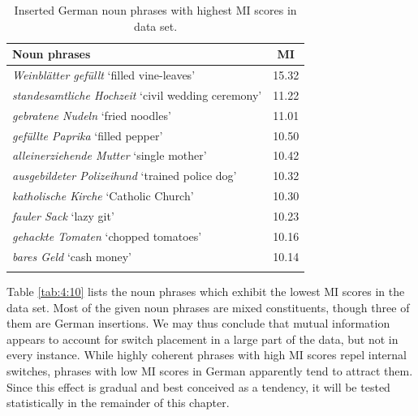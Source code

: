 \begin{table}
		\begin{tabular}{lr}
		\lsptoprule
			Noun phrases	& \multicolumn{1}{c}{MI} \\\midrule
			\textit{Weinblätter gefüllt	} `filled vine-leaves'	&15.32\\
			\textit{standesamtliche Hochzeit} `civil wedding ceremony'	&11.22\\
			\textit{gebratene Nudeln} `fried noodles'	&11.01\\
			\textit{gefüllte Paprika} `filled pepper'	&10.50\\
			\textit{alleinerziehende Mutter} `single mother'	&10.42\\
			\textit{ausgebildeter Polizeihund}	`trained police dog'	&10.32\\
			\textit{katholische Kirche} `Catholic Church'	&10.30\\
			\textit{fauler Sack} `lazy git'		&10.23\\
			\textit{gehackte Tomaten} `chopped tomatoes'	&10.16\\
			\textit{bares Geld}	 `cash money'	&10.14\\
			\lspbottomrule 
		\end{tabular}
\caption{Inserted German noun phrases with highest MI scores in data set.\label{tab:4:9}} 
\end{table}


Table \ref{tab:4:10} lists the noun phrases which exhibit the lowest MI scores in the data set. Most of the given noun phrases are mixed constituents, though three of them are German insertions. We may thus conclude that mutual information appears to account for switch placement in a large part of the data, but not in every instance. While highly coherent phrases with high MI scores repel internal switches, phrases with low MI scores in German apparently tend to attract them. Since this effect is gradual and best conceived as a tendency, it will be tested statistically in the remainder of this chapter.


